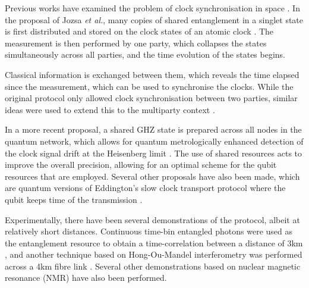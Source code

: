 Previous works have examined the problem of clock synchronisation in space . In the proposal of Jozsa \textit{et al.}, many copies of shared entanglement in a singlet state is first distributed and stored on the clock states of an atomic clock \cite{bib:jozsa00}. The measurement is then performed by one party, which collapses the states simultaneously across all parties, and the time evolution of the states begins.

Classical information is exchanged between them, which reveals the time elapsed since the measurement, which can be used to synchronise the clocks. While the original protocol only allowed clock synchronisation between two parties, similar ideas were used to extend this to the multiparty context \cite{bib:krvco2002quantum, bib:ben2011optimized, bib:ren2012clock}.

In a more recent proposal, a shared GHZ state is prepared across all nodes in the quantum network, which allows for quantum metrologically enhanced detection of the clock signal drift at the Heisenberg limit \cite{bib:komar14}. The use of shared resources acts to improve the overall precision, allowing for an optimal scheme for the qubit resources that are employed. Several other proposals have also been made, which are quantum versions of Eddington's slow clock transport protocol where the qubit keeps time of the transmission \cite{bib:chuang2000quantum, bib:tavakoli2015quantum}. 

Experimentally, there have been several demonstrations of the protocol, albeit at relatively short distances. Continuous time-bin entangled photons were used as the entanglement resource to obtain a time-correlation between a distance of 3km \cite{bib:valencia2004distant}, and another technique based on Hong-Ou-Mandel interferometry was performed across a 4km fibre link \cite{bib:quan2016demonstration}. Several other demonstrations based on nuclear magnetic resonance (NMR) \cite{bib:zhang2004nuclear, bib:kong2017implementation} have also been performed. 

